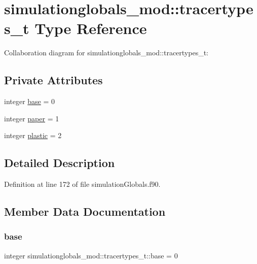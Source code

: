 \hypertarget{structsimulationglobals__mod_1_1tracertypes__t}{}\section{simulationglobals\+\_\+mod\+:\+:tracertypes\+\_\+t Type Reference}
\label{structsimulationglobals__mod_1_1tracertypes__t}


Collaboration diagram for simulationglobals\+\_\+mod\+:\+:tracertypes\+\_\+t\+:
\subsection*{Private Attributes}
\begin{DoxyCompactItemize}
\item 
integer \mbox{\hyperlink{structsimulationglobals__mod_1_1tracertypes__t_a809513560a6ee14cba1bb397a5c73404}{base}} = 0
\item 
integer \mbox{\hyperlink{structsimulationglobals__mod_1_1tracertypes__t_a2f1cf14744f82ea11344cfc7ec1daa7d}{paper}} = 1
\item 
integer \mbox{\hyperlink{structsimulationglobals__mod_1_1tracertypes__t_a7996bd824036f8a4f4febde191b46afc}{plastic}} = 2
\end{DoxyCompactItemize}


\subsection{Detailed Description}


Definition at line 172 of file simulation\+Globals.\+f90.



\subsection{Member Data Documentation}
\mbox{\label{structsimulationglobals__mod_1_1tracertypes__t_a809513560a6ee14cba1bb397a5c73404}} 
\subsubsection{\texorpdfstring{base}{base}}
{\footnotesize\ttfamily integer simulationglobals\+\_\+mod\+::tracertypes\+\_\+t\+::base = 0\hspace{0.3cm}{\ttfamily [private]}}



